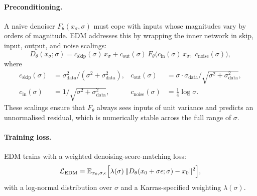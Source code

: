 \paragraph{Preconditioning.} A naive denoiser $F_\theta(x_\sigma, \sigma)$ must cope with inputs whose magnitudes vary by orders of magnitude. EDM addresses this by wrapping the inner network in skip, input, output, and noise scalings:
\begin{equation}
  D_\theta(x_\sigma; \sigma) = c_{\text{skip}}(\sigma)\,x_\sigma + c_{\text{out}}(\sigma)\,F_\theta\bigl(c_{\text{in}}(\sigma)\,x_\sigma,\;c_{\text{noise}}(\sigma)\bigr),
  \label{eq:edm-precond}
\end{equation}
where
\begin{align*}
  c_{\text{skip}}(\sigma) &= \sigma_{\text{data}}^2 / (\sigma^2 + \sigma_{\text{data}}^2), &
  c_{\text{out}}(\sigma) &= \sigma \cdot \sigma_{\text{data}} / \sqrt{\sigma^2 + \sigma_{\text{data}}^2}, \\
  c_{\text{in}}(\sigma) &= 1 / \sqrt{\sigma^2 + \sigma_{\text{data}}^2}, &
  c_{\text{noise}}(\sigma) &= \tfrac{1}{4}\log \sigma.
\end{align*}
These scalings ensure that $F_\theta$ always sees inputs of unit variance and predicts an unnormalised residual, which is numerically stable across the full range of $\sigma$.

\paragraph{Training loss.} EDM trains with a weighted denoising-score-matching loss:
\begin{equation}
  \mathcal{L}_{\text{EDM}} = \mathbb{E}_{x_0, \sigma, \epsilon}\Bigl[\lambda(\sigma)\,\|D_\theta(x_0 + \sigma\epsilon; \sigma) - x_0\|^2\Bigr],
  \label{eq:edm-loss}
\end{equation}
with a log-normal distribution over $\sigma$ and a Karras-specified weighting $\lambda(\sigma)$.

